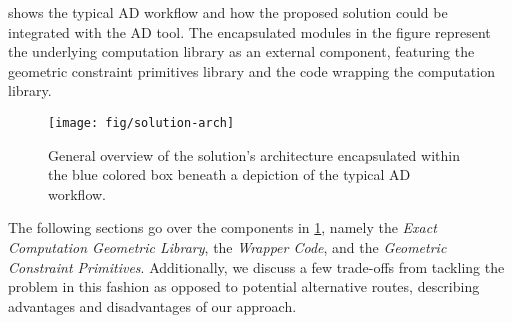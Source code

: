  shows the typical \ac{AD} workflow and how the proposed
solution could be integrated with the \ac{AD} tool.  The encapsulated modules in
the figure represent the underlying computation library as an external
component, featuring the geometric constraint primitives library and the code
wrapping the computation library.

\begin{figure}[htb]
  \texttt{[image: fig/solution-arch]}
  \caption[Solution architecture within AD workflow]{
    General overview of the solution's architecture encapsulated within the
    blue colored box beneath a depiction of the typical \ac{AD} workflow.}%
  \label{fig:solution.arch}
\end{figure}

The following sections go over the components in \cref{fig:solution.arch},
namely the \textit{Exact Computation Geometric Library}, the \textit{Wrapper
Code}, and the \textit{Geometric Constraint Primitives}.  Additionally, we
discuss a few trade-offs from tackling the problem in this fashion as opposed to
potential alternative routes, describing advantages and disadvantages of our
approach.



